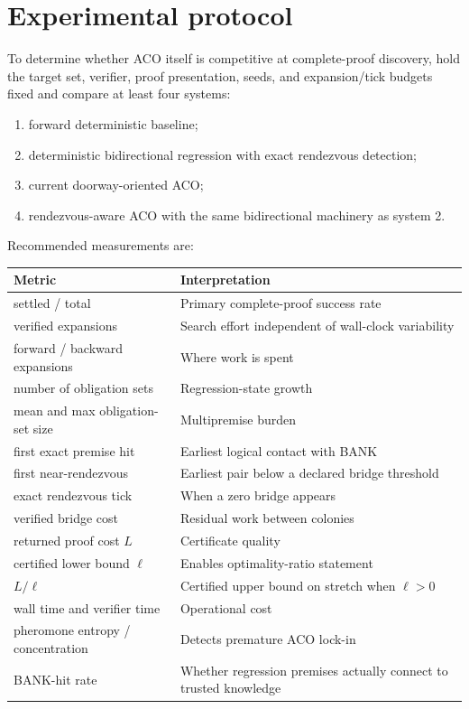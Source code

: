 \documentclass[11pt]{article}
\begin{document}
\section{Experimental protocol}

To determine whether ACO itself is competitive at complete-proof discovery, hold the target set, verifier, proof presentation, seeds, and expansion/tick budgets fixed and compare at least four systems:
\begin{enumerate}
\item forward deterministic baseline;
\item deterministic bidirectional regression with exact rendezvous detection;
\item current doorway-oriented ACO;
\item rendezvous-aware ACO with the same bidirectional machinery as system 2.
\end{enumerate}

Recommended measurements are:
\begin{longtable}{p{}p{}}
\toprule
Metric & Interpretation \\
\midrule
settled / total & Primary complete-proof success rate \\
verified expansions & Search effort independent of wall-clock variability \\
forward / backward expansions & Where work is spent \\
number of obligation sets & Regression-state growth \\
mean and max obligation-set size & Multipremise burden \\
first exact premise hit & Earliest logical contact with BANK \\
first near-rendezvous & Earliest pair below a declared bridge threshold \\
exact rendezvous tick & When a zero bridge appears \\
verified bridge cost & Residual work between colonies \\
returned proof cost $L$ & Certificate quality \\
certified lower bound $\ell$ & Enables optimality-ratio statement \\
$L/\ell$ & Certified upper bound on stretch when $\ell>0$ \\
wall time and verifier time & Operational cost \\
pheromone entropy / concentration & Detects premature ACO lock-in \\
BANK-hit rate & Whether regression premises actually connect to trusted knowledge \\
\bottomrule
\end{longtable}
\end{document}
